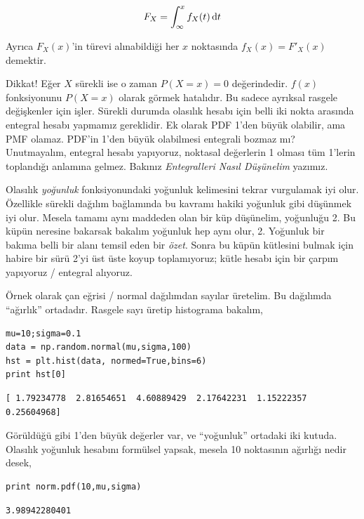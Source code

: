 \documentclass[12pt,fleqn]{article}\usepackage{../../common}
\begin{document}
$$ F_X = \int_{\infty}^{x}f_X(t) \,\mathrm{d} t $$

Ayrıca $F_X(x)$'in türevi alınabildiği her $x$ noktasında  $f_X(x) = F'_X(x)$
demektir. 

Dikkat! Eğer $X$ sürekli ise o zaman $P(X = x) = 0$ değerindedir. $f(x)$
fonksiyonunu $P(X=x)$ olarak görmek hatalıdır. Bu sadece ayrıksal rasgele
değişkenler için işler. Sürekli durumda olasılık hesabı için belli iki
nokta arasında entegral hesabı yapmamız gereklidir. Ek olarak PDF 1'den
büyük olabilir, ama PMF olamaz. PDF'in 1'den büyük olabilmesi entegrali
bozmaz mı? Unutmayalım, entegral hesabı yapıyoruz, noktasal değerlerin 1
olması tüm 1'lerin toplandığı anlamına gelmez. Bakınız {\em Entegralleri
  Nasıl Düşünelim} yazımız.

Olasılık {\em yoğunluk} fonksiyonundaki yoğunluk kelimesini tekrar
vurgulamak iyi olur. Özellikle sürekli dağılım bağlamında bu kavramı hakiki
yoğunluk gibi düşünmek iyi olur. Mesela tamamı aynı maddeden olan bir küp
düşünelim, yoğunluğu 2. Bu küpün neresine bakarsak bakalım yoğunluk hep
aynı olur, 2. Yoğunluk bir bakıma belli bir alanı temsil eden bir {\em
  özet}. Sonra bu küpün kütlesini bulmak için habire bir sürü 2'yi üst üste
koyup toplamıyoruz; kütle hesabı için bir çarpım yapıyoruz / entegral
alıyoruz.

Örnek olarak çan eğrisi / normal dağılımdan sayılar üretelim. Bu dağılımda
``ağırlık'' ortadadır. Rasgele sayı üretip histograma bakalım,

\begin{verbatim}
mu=10;sigma=0.1
data = np.random.normal(mu,sigma,100)
hst = plt.hist(data, normed=True,bins=6)
print hst[0]
\end{verbatim}

\begin{verbatim}
[ 1.79234778  2.81654651  4.60889429  2.17642231  1.15222357  0.25604968]
\end{verbatim}

Görüldüğü gibi 1'den büyük değerler var, ve ``yoğunluk'' ortadaki iki
kutuda. Olasılık yoğunluk hesabını formülsel yapsak, mesela 10 noktasının
ağırlığı nedir desek, 

\begin{verbatim}
print norm.pdf(10,mu,sigma)
\end{verbatim}

\begin{verbatim}
3.98942280401
\end{verbatim}
\end{document}
